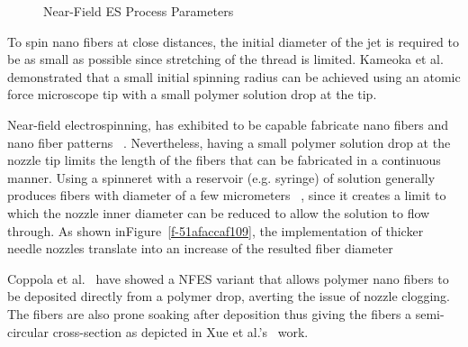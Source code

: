 \documentclass[5p,,preprint,12pt,twocolumn]{elsarticle}
\makeatletter
\def\fixFloatSize#1{}%
\makeatother
\begin{document}
\bgroup
\fixFloatSize{images/43f61edd-73cd-4222-830e-3333f92934e9-uimg_nfesvariants.png}
\begin{figure}[!htbp]
\centering \makeatletter{}
\makeatother 
\caption{{Near-Field ES Process Parameters}}
\label{f-3629d3a3f9cf}
\end{figure}
\egroup
To spin nano fibers at close distances, the initial diameter of the jet is required to be as small as possible since stretching of the thread is limited. Kameoka et al.\unskip~\cite{527120:12321556} demonstrated that a small initial spinning radius can be achieved using an atomic force microscope tip with a small polymer solution drop at the tip.

Near-field electrospinning, has exhibited to be capable fabricate nano fibers and nano fiber patterns \unskip~\cite{527120:11974321}. Nevertheless, having a small polymer solution drop at the nozzle tip limits the length of the fibers that can be fabricated in a continuous manner. Using a spinneret with a reservoir (e.g. syringe) of solution generally produces fibers with diameter of a few micrometers \unskip~\cite{527120:11974310,527120:11974326}, since it creates a limit to which the nozzle inner diameter can be reduced to allow the solution to flow through. As shown inFigure~\ref{f-51afaccaf109}, the implementation of thicker needle nozzles translate into an increase of the resulted fiber diameter

Coppola et al.\unskip~\cite{527120:11974307} have showed a NFES variant that allows polymer nano fibers to be deposited directly from a polymer drop, averting the issue of nozzle clogging. The fibers are also prone soaking after deposition thus giving the fibers a semi-circular cross-section as depicted in Xue et al.'s\unskip~\cite{527120:11974326} work.
\end{document}
